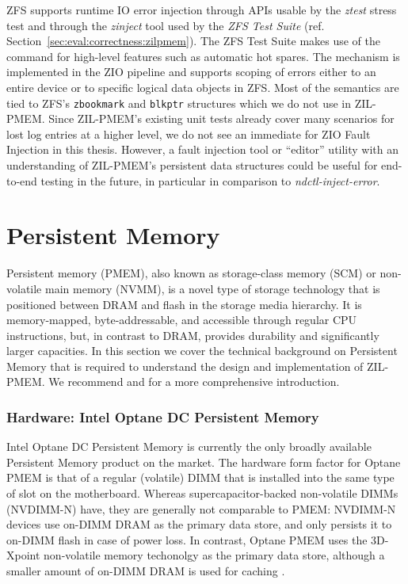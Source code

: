 \documentclass[12pt,a4paper,twoside]{book}
\begin{document}
ZFS supports runtime IO error injection through APIs usable by the \textit{ztest} stress test and through the \textit{zinject} tool used by the \textit{ZFS Test Suite} (ref. Section~\ref{sec:eval:correctness:zilpmem}).
The ZFS Test Suite makes use of the command for high-level features such as automatic hot spares.
The mechanism is implemented in the ZIO pipeline and supports scoping of errors either to an entire device or to specific logical data objects in ZFS.
Most of the semantics are tied to ZFS’s \lstinline{zbookmark} and \lstinline{blkptr} structures which we do not use in ZIL-PMEM.
Since ZIL-PMEM's existing unit tests already cover many scenarios for lost log entries at a higher level, we do not see an immediate for ZIO Fault Injection in this thesis.
However, a fault injection tool or ``editor'' utility with an understanding of ZIL-PMEM's persistent data structures could be useful for end-to-end testing in the future, in particular in comparison to \textit{ndctl-inject-error}.

\section{Persistent Memory}
Persistent memory (PMEM), also known as storage-class memory (SCM) or non-volatile main memory (NVMM), is a novel type of storage technology that is positioned between DRAM and flash in the storage media hierarchy.
It is memory-mapped, byte-addressable, and accessible through regular CPU instructions, but, in contrast to DRAM, provides durability and significantly larger capacities.
In this section we cover the technical background on Persistent Memory that is required to understand the design and implementation of ZIL-PMEM.
We recommend \cite{rudoffPersistentMemoryProgramming2017} and \cite{Scargall2020} for a more comprehensive introduction.

\subsubsection{Hardware: Intel Optane DC Persistent Memory}
Intel Optane DC Persistent Memory is currently the only broadly available Persistent Memory product on the market.
The hardware form factor for Optane PMEM is that of a regular (volatile) DIMM that is installed into the same type of slot on the motherboard.
Whereas supercapacitor-backed non-volatile DIMMs (NVDIMM-N) have, they are generally not comparable to PMEM:
NVDIMM-N devices use on-DIMM DRAM as the primary data store, and only persists it to on-DIMM flash in case of power loss.
In contrast, Optane PMEM uses the 3D-Xpoint non-volatile memory techonolgy as the primary data store, although a smaller amount of on-DIMM DRAM is used for caching \cite{yangEmpiricalGuideBehavior2020}.
\end{document}
